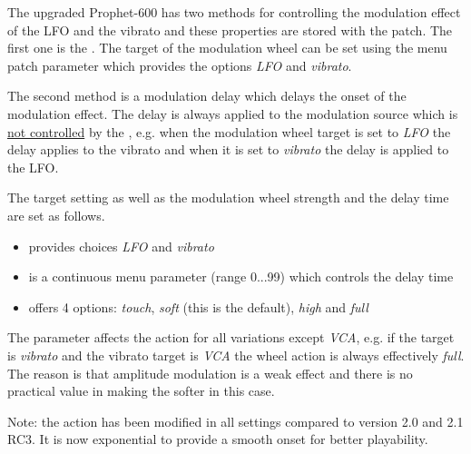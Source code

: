 The upgraded Prophet-600 has two methods for controlling the modulation effect of the LFO and the vibrato and these properties are  stored with the patch. The first one is the \modwheel. The target of the modulation wheel can be set using the menu patch parameter \modwheeltarget which provides the options \textit{LFO} and \textit{vibrato}. 

The second method is a modulation delay which delays the onset of the modulation effect. The delay is always applied to the modulation source which is \underline{not controlled} by the \modwheel, e.g. when the modulation wheel target is set to \textit{LFO} the delay applies to the vibrato and when it is set to \textit{vibrato} the delay is applied to the LFO.

The target setting as well as the modulation wheel strength and the delay time are set as follows. 
\begin{itemize}
  \item \modwheeltarget provides choices \textit{LFO} and \textit{vibrato}
  \item \moddelay is a continuous menu parameter (range 0...99) which controls the delay time
  \item \modwheelrange offers 4 options: \textit{touch}, \textit{soft} (this is the default), \textit{high} and \textit{full}
\end{itemize} 

The parameter \modwheelrange affects the \modwheel action for all variations except \textit{VCA}, e.g. if the target is \textit{vibrato} and the vibrato target is \textit{VCA} the wheel action is always effectively \textit{full}. The reason is that amplitude modulation is a weak effect and there is no practical value in making the \modwheel softer in this case.

Note: the \modwheel action has been modified in all settings compared to version 2.0 and 2.1 RC3. It is now exponential to provide a smooth onset for better playability.
